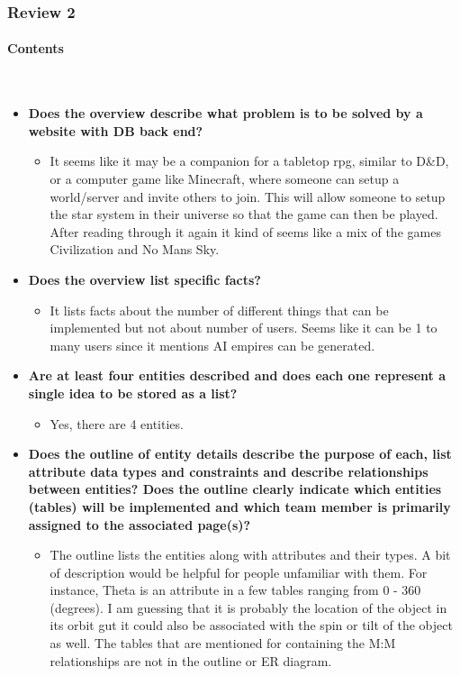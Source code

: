 \documentclass[12pt]{article}
\newcommand{\hiparagraph}[1]{\paragraph{#1}\mbox{}\vspace{-2em}\\}
\begin{document}
\begin{appendices}
\subsubsection{Review 2}
\hiparagraph{Contents}
\begin{itemize}
    \item \textbf{Does the overview describe what problem is to be solved by a website with DB back end?}
    \begin{itemize}
        \item It seems like it may be a companion for a tabletop rpg, similar to D\&D, or a computer game like Minecraft, where someone can setup a world/server and invite others to join. This will allow someone to setup the star system in their universe so that the game can then be played. After reading through it again it kind of seems like a mix of the games Civilization and No Mans Sky.
    \end{itemize}
    \item \textbf{Does the overview list specific facts?}
    \begin{itemize}
        \item It lists facts about the number of different things that can be implemented but not about number of users. Seems like it can be 1 to many users since it mentions AI empires can be generated.
    \end{itemize}
    \item \textbf{Are at least four entities described and does each one represent a single idea to be stored as a list?}
    \begin{itemize}
        \item Yes, there are 4 entities.
    \end{itemize}
    \item \textbf{Does the outline of entity details describe the purpose of each, list attribute data types and constraints and describe relationships between entities?  Does the outline clearly indicate which entities (tables) will be implemented and which team member is primarily assigned to the associated page(s)?}
    \begin{itemize}
        \item The outline lists the entities along with attributes and their types. A bit of description would be helpful for people unfamiliar with them. For instance, Theta is an attribute in a few tables ranging from 0 - 360 (degrees). I am guessing that it is probably the location of the object in its orbit gut it could also be associated with the spin or tilt of the object as well. The tables that are mentioned for containing the M:M relationships are not in the outline or ER diagram.

\end{itemize}
\end{itemize}
\end{appendices}
\end{document}
